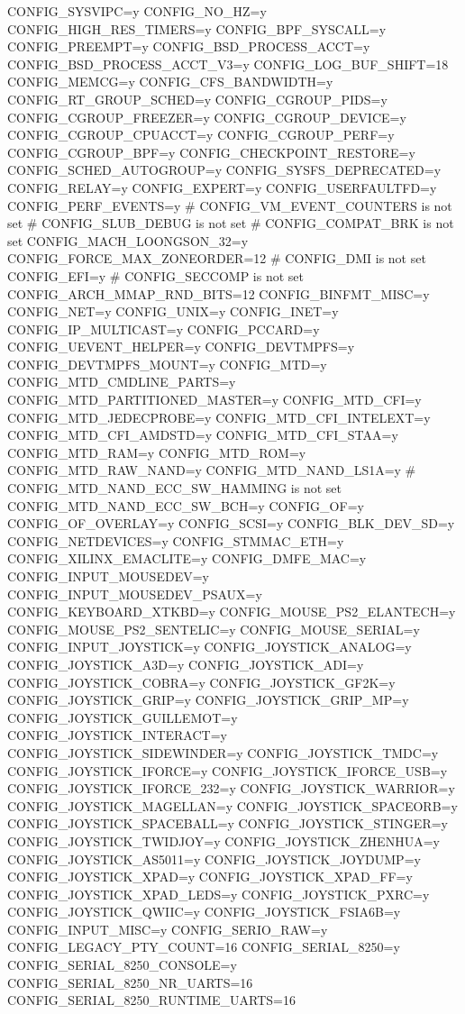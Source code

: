 \begin{CodeBlock}[language=BookConfig]
CONFIG_SYSVIPC=y
CONFIG_NO_HZ=y
CONFIG_HIGH_RES_TIMERS=y
CONFIG_BPF_SYSCALL=y
CONFIG_PREEMPT=y
CONFIG_BSD_PROCESS_ACCT=y
CONFIG_BSD_PROCESS_ACCT_V3=y
CONFIG_LOG_BUF_SHIFT=18
CONFIG_MEMCG=y
CONFIG_CFS_BANDWIDTH=y
CONFIG_RT_GROUP_SCHED=y
CONFIG_CGROUP_PIDS=y
CONFIG_CGROUP_FREEZER=y
CONFIG_CGROUP_DEVICE=y
CONFIG_CGROUP_CPUACCT=y
CONFIG_CGROUP_PERF=y
CONFIG_CGROUP_BPF=y
CONFIG_CHECKPOINT_RESTORE=y
CONFIG_SCHED_AUTOGROUP=y
CONFIG_SYSFS_DEPRECATED=y
CONFIG_RELAY=y
CONFIG_EXPERT=y
CONFIG_USERFAULTFD=y
CONFIG_PERF_EVENTS=y
# CONFIG_VM_EVENT_COUNTERS is not set
# CONFIG_SLUB_DEBUG is not set
# CONFIG_COMPAT_BRK is not set
CONFIG_MACH_LOONGSON_32=y
CONFIG_FORCE_MAX_ZONEORDER=12
# CONFIG_DMI is not set
CONFIG_EFI=y
# CONFIG_SECCOMP is not set
CONFIG_ARCH_MMAP_RND_BITS=12
CONFIG_BINFMT_MISC=y
CONFIG_NET=y
CONFIG_UNIX=y
CONFIG_INET=y
CONFIG_IP_MULTICAST=y
CONFIG_PCCARD=y
CONFIG_UEVENT_HELPER=y
CONFIG_DEVTMPFS=y
CONFIG_DEVTMPFS_MOUNT=y
CONFIG_MTD=y
CONFIG_MTD_CMDLINE_PARTS=y
CONFIG_MTD_PARTITIONED_MASTER=y
CONFIG_MTD_CFI=y
CONFIG_MTD_JEDECPROBE=y
CONFIG_MTD_CFI_INTELEXT=y
CONFIG_MTD_CFI_AMDSTD=y
CONFIG_MTD_CFI_STAA=y
CONFIG_MTD_RAM=y
CONFIG_MTD_ROM=y
CONFIG_MTD_RAW_NAND=y
CONFIG_MTD_NAND_LS1A=y
# CONFIG_MTD_NAND_ECC_SW_HAMMING is not set
CONFIG_MTD_NAND_ECC_SW_BCH=y
CONFIG_OF=y
CONFIG_OF_OVERLAY=y
CONFIG_SCSI=y
CONFIG_BLK_DEV_SD=y
CONFIG_NETDEVICES=y
CONFIG_STMMAC_ETH=y
CONFIG_XILINX_EMACLITE=y
CONFIG_DMFE_MAC=y
CONFIG_INPUT_MOUSEDEV=y
CONFIG_INPUT_MOUSEDEV_PSAUX=y
CONFIG_KEYBOARD_XTKBD=y
CONFIG_MOUSE_PS2_ELANTECH=y
CONFIG_MOUSE_PS2_SENTELIC=y
CONFIG_MOUSE_SERIAL=y
CONFIG_INPUT_JOYSTICK=y
CONFIG_JOYSTICK_ANALOG=y
CONFIG_JOYSTICK_A3D=y
CONFIG_JOYSTICK_ADI=y
CONFIG_JOYSTICK_COBRA=y
CONFIG_JOYSTICK_GF2K=y
CONFIG_JOYSTICK_GRIP=y
CONFIG_JOYSTICK_GRIP_MP=y
CONFIG_JOYSTICK_GUILLEMOT=y
CONFIG_JOYSTICK_INTERACT=y
CONFIG_JOYSTICK_SIDEWINDER=y
CONFIG_JOYSTICK_TMDC=y
CONFIG_JOYSTICK_IFORCE=y
CONFIG_JOYSTICK_IFORCE_USB=y
CONFIG_JOYSTICK_IFORCE_232=y
CONFIG_JOYSTICK_WARRIOR=y
CONFIG_JOYSTICK_MAGELLAN=y
CONFIG_JOYSTICK_SPACEORB=y
CONFIG_JOYSTICK_SPACEBALL=y
CONFIG_JOYSTICK_STINGER=y
CONFIG_JOYSTICK_TWIDJOY=y
CONFIG_JOYSTICK_ZHENHUA=y
CONFIG_JOYSTICK_AS5011=y
CONFIG_JOYSTICK_JOYDUMP=y
CONFIG_JOYSTICK_XPAD=y
CONFIG_JOYSTICK_XPAD_FF=y
CONFIG_JOYSTICK_XPAD_LEDS=y
CONFIG_JOYSTICK_PXRC=y
CONFIG_JOYSTICK_QWIIC=y
CONFIG_JOYSTICK_FSIA6B=y
CONFIG_INPUT_MISC=y
CONFIG_SERIO_RAW=y
CONFIG_LEGACY_PTY_COUNT=16
CONFIG_SERIAL_8250=y
CONFIG_SERIAL_8250_CONSOLE=y
CONFIG_SERIAL_8250_NR_UARTS=16
CONFIG_SERIAL_8250_RUNTIME_UARTS=16

\end{CodeBlock}
